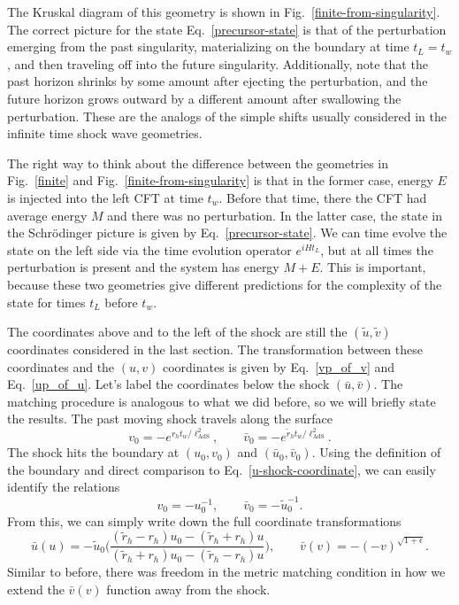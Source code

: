 \documentclass[12pt]{article}
\numberwithin{equation}{section}
\newcommand{\be}{\begin{equation}}
\newcommand{\ee}{\end{equation}}
\newcommand{\lads}{\ell_{\text{AdS}}}
\renewcommand{\eqref}[1]{Eq.~\ref{#1}}
\begin{document}
The Kruskal diagram of this geometry is shown in Fig.~\ref{finite-from-singularity}. The correct picture for the state \eqref{precursor-state} is that of the perturbation emerging from the past singularity, materializing on the boundary at time $t_L=t_w$, and then traveling off into the future singularity. Additionally, note that the past horizon shrinks by some amount after ejecting the perturbation, and the future horizon grows outward by a different amount after swallowing the perturbation. These are the analogs of the simple shifts usually considered in the infinite time shock wave geometries.

The right way to think about the difference between the geometries in Fig.~\ref{finite} and Fig.~\ref{finite-from-singularity} is that in the former case, energy $E$ is injected into the left CFT at time $t_w$. Before that time, there the CFT had average energy $M$ and there was no perturbation. In the latter case, the state in the Schr\"{o}dinger picture is given by \eqref{precursor-state}. We can time evolve the state on the left side via the time evolution operator $e^{iHt_L}$, but at all times the perturbation is present and the system has energy $M+E$. This is important, because these two geometries give different predictions for the complexity of the state for times $t_L$ before $t_w$.

The coordinates above and to the left of the shock are still the $(\tilde{u}, \tilde{v})$ coordinates considered in the last section. The transformation between these coordinates and the $(u,v)$ coordinates is given by \eqref{vp_of_v} and \eqref{up_of_u}. Let's label the coordinates below the shock $(\bar{u}, \bar{v})$. The matching procedure is analogous to what we did before, so we will briefly state the results. The past moving shock travels along the surface
\be
v_0 = - e^{r_{h} t_w / \lads^2}, \qquad \bar{v}_0 = - e^{\tilde{r}_{h} t_w / \lads^2}.
\ee
The shock hits the boundary at $(u_0, v_0)$ and $(\bar{u}_0, \bar{v}_0)$. Using the definition of the boundary and direct comparison to \eqref{u-shock-coordinate}, we can easily identify the relations
\be
v_0 = -u_0^{-1}, \qquad \bar{v}_0 = - \tilde{u}_0^{-1}.
\ee
From this, we can simply write down the full coordinate transformations
\be
\bar{u}(u) = -\tilde{u}_0 \bigg( \frac{ (\tilde{r}_{h} - r_{h}) u_0 - (\tilde{r}_{h} + r_{h})u}{(\tilde{r}_{h} + r_{h}) u_0 - (\tilde{r}_{h} -r_{h})u } \bigg), \qquad \bar{v}(v) = -(-v)^{\sqrt{1+\epsilon} }.
\ee
Similar to before, there was freedom in the metric matching condition in how we extend the $\bar{v}(v)$ function away from the shock.
\end{document}
